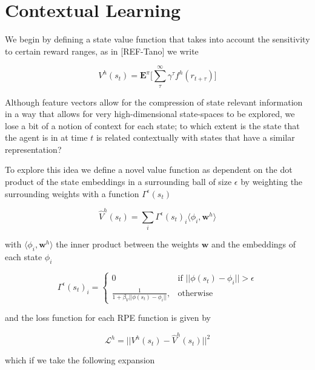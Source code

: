 \documentclass{article}
\begin{document}
\newpage
\section{Contextual Learning}

We begin by defining a state value function that takes into account the sensitivity to certain 
reward ranges, as in [REF-Tano] we write 

\begin{equation}
  V^h(s_t) = \mathbf{E}^\pi \big[  \sum_\tau^\infty \gamma^\tau f^h(r_{t+\tau}) \big ]
\end{equation}

Although feature vectors allow for the compression of state relevant information in a way that 
allows for very high-dimensional state-spaces to be explored, we lose a bit of a notion of context
for each state; to which extent is the state that the agent is in at time $t$ is related contextually 
with states that have a similar representation? 

To explore this idea we define a novel value function as dependent on the dot product of the state embeddings in 
a surrounding ball of size $\epsilon$ by weighting the surrounding weights with a function $\Gamma^\epsilon(s_t)$


\begin{equation}
  \hat{V}^h(s_t) = \sum_{i} \Gamma^\epsilon(s_t)_i \langle\phi_i,\mathbf{w}^h\rangle
\end{equation}

with $\langle\phi_i,\mathbf{w}^h\rangle$ the inner product between the weights $\mathbf{w}$ and the embeddings of each state $\phi_i$

\begin{equation}
\Gamma^\epsilon(s_t)_i = 
\begin{cases}
    0 & \text{if } ||\phi(s_t)-\phi_i||>\epsilon\\
     \frac{1}{1+\beta_V ||\phi(s_t)-\phi_i||},         & \text{otherwise}
\end{cases}
\end{equation}

and the loss function for each RPE function is given by

\begin{equation}
  \mathcal{L}^h = ||V^h(s_t) - \hat{V}^h(s_t)||^2
\end{equation}

which if we take the following expansion
\end{document}
